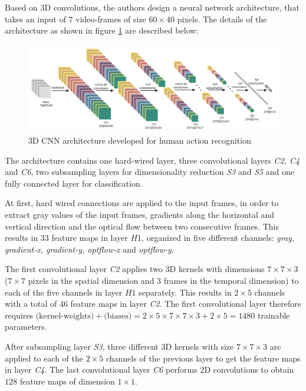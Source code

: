 Based on 3D convolutions, the authors design a neural network architecture, that takes an input of $7$ video-frames of size $60 \times 40$ pixels.
The details of the architecture as shown in figure \ref{fig:3dconv_architecture} are described below:

\begin{figure}[H]
    \centering
    \includegraphics[width=\textwidth]{img_deep/3dconv_architecture}
    \caption{3D CNN architecture developed for human action recognition \cite{ji_3d_2013}}
    \label{fig:3dconv_architecture}
\end{figure}
The architecture contains one hard-wired layer, three convolutional layers \textit{C2, C4} and \textit{C6}, two subsampling layers for dimensionality reduction \textit{S3} and \textit{S5} and one fully connected layer for classification.

At first, hard wired connections are applied to the input frames, in order to extract gray values of the input frames, gradients along the horizontal and vertical direction and the optical flow between two consecutive frames. This results in 33 feature maps in layer $H1$, organized in five different channels: \textit{gray, gradient-x, gradient-y, optflow-x} and \textit{optflow-y}.

The first convolutional layer \textit{C2} applies two 3D kernels with dimensions $7\times7\times3$ ($7\times7$ pixels in the spatial dimension and $3$ frames in the temporal dimension) to each of the five channels in layer $H1$ separately. 
This results in $2\times5$ channels with a total of 46 feature maps in layer \textit{C2}.
The first convolutional layer therefore requires $\text{(kernel-weights)} + \text{(biases)} = 2 \times 5 \times 7 \times 7 \times 3 + 2 \times 5 = 1480$ trainable parameters. 

After subsampling layer \textit{S3}, three different 3D kernels with size $7 \times 7 \times 3$ are applied to each of the $2 \times 5$ channels of the previous layer to get the feature maps in layer \textit{C4}.
The last convolutional layer \textit{C6} performs 2D convolutions to obtain $128$ feature maps of dimension $1 \times 1$.

